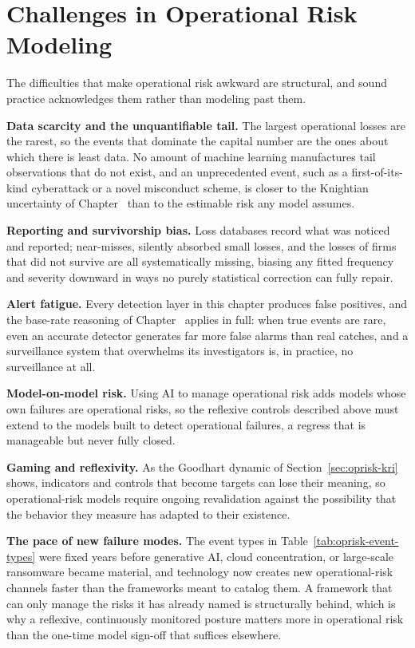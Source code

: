 \documentclass[../ai_in_finance]{subfiles}
\begin{document}
\section{Challenges in Operational Risk Modeling}
\label{sec:oprisk-challenges}

The difficulties that make operational risk awkward are structural, and sound practice acknowledges them rather than modeling past them.

\textbf{Data scarcity and the unquantifiable tail.} The largest operational losses are the rarest, so the events that dominate the capital number are the ones about which there is least data. No amount of machine learning manufactures tail observations that do not exist, and an unprecedented event, such as a first-of-its-kind cyberattack or a novel misconduct scheme, is closer to the Knightian uncertainty of Chapter~ than to the estimable risk any model assumes.

\textbf{Reporting and survivorship bias.} Loss databases record what was noticed and reported; near-misses, silently absorbed small losses, and the losses of firms that did not survive are all systematically missing, biasing any fitted frequency and severity downward in ways no purely statistical correction can fully repair.

\textbf{Alert fatigue.} Every detection layer in this chapter produces false positives, and the base-rate reasoning of Chapter~ applies in full: when true events are rare, even an accurate detector generates far more false alarms than real catches, and a surveillance system that overwhelms its investigators is, in practice, no surveillance at all.

\textbf{Model-on-model risk.} Using AI to manage operational risk adds models whose own failures are operational risks, so the reflexive controls described above must extend to the models built to detect operational failures, a regress that is manageable but never fully closed.

\textbf{Gaming and reflexivity.} As the Goodhart dynamic of Section~\ref{sec:oprisk-kri} shows, indicators and controls that become targets can lose their meaning, so operational-risk models require ongoing revalidation against the possibility that the behavior they measure has adapted to their existence.

\textbf{The pace of new failure modes.} The event types in Table~\ref{tab:oprisk-event-types} were fixed years before generative AI, cloud concentration, or large-scale ransomware became material, and technology now creates new operational-risk channels faster than the frameworks meant to catalog them. A framework that can only manage the risks it has already named is structurally behind, which is why a reflexive, continuously monitored posture matters more in operational risk than the one-time model sign-off that suffices elsewhere.
\end{document}
